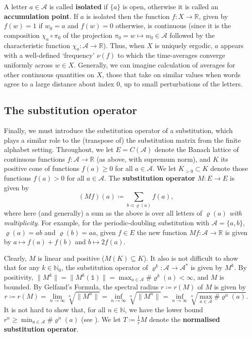 \documentclass[11pt]{amsart}
\numberwithin{equation}{section}
\theoremstyle{plain}
\theoremstyle{definition}
\newcommand{\R}{{\mathbb R}}
\newcommand{\N}{{\mathbb N}}
\newcommand{\mc}{\mathcal}
\newcommand{\A}{\mc A}
\newcommand{\sub}{\varrho}
\newcommand{\bbo}{\mathds{1}} %
\begin{document}
A letter \(a \in \A\) is called \textbf{isolated} if \(\{a\}\) is open, otherwise it is called an \textbf{accumulation point}. If \(a\) is isolated then the function \(f \colon X \to \R\), given by \(f(w) = 1\) if \(w_0 = a\) and \(f(w) = 0\) otherwise, is continuous (since it is the composition \(\chi_a \circ \pi_0\) of the projection \(\pi_0 = w \mapsto w_0 \in \A\) followed by the characteristic function \(\chi_a \colon \A \to \R\)). Thus, when \(X\) is uniquely ergodic, \(a\) appears with a well-defined `frequency' \(\nu(f)\) to which the time-averages converge uniformly across \(w \in X\). Generally, we can imagine calculation of averages for other continuous quantities on \(X\), those that take on similar values when words agree to a large distance about index \(0\), up to small perturbations of the letters.

\subsection{The substitution operator} \label{sec:sub operators}
Finally, we must introduce the substitution operator of a substitution, which plays a similar role to the (transpose of) the substitution matrix from the finite alphabet setting. Throughout, we let \(E = C(\A)\) denote the Banach lattice of continuous functions \(f \colon \A \to \R\) (as above, with supremum norm), and \(K\) its positive cone of functions \(f(a) \geq 0\) for all \(a \in \A\). We let \(K_{>0} \subset K\) denote those functions \(f(a) > 0\) for all \(a \in \A\). The \textbf{substitution operator} \(M \colon E \to E\) is given by
\[
(M f)(a) \coloneqq \sum_{b \triangleleft \sub(a)} f(a) ,
\]
where here (and generally) a sum as the above is over all letters of \(\sub(a)\) \emph{with multiplicity}. For example, for the periodic-doubling substitution with \(\A = \{a,b\}\), \(\sub(a) = ab\) and \(\sub(b) = aa\), given \(f \in E\) the new function \(Mf \colon \A \to \R\) is given by \(a \mapsto f(a) + f(b)\) and \(b \mapsto 2 f(a)\).

Clearly, \(M\) is linear and positive (\(M(K) \subseteq K\)). It also is not difficult to show \cite[Lemma 4.5]{MRW25} that for any \(k \in \N_0\), the substitution operator of \(\sub^k \colon \A \to \A^\ast\) is given by \(M^k\). By positivity, \(\|M^k\| = \|M^k(\bbo)\| = \max_{a \in \A} \# \sub^k(a) < \infty\), and \(M\) is bounded. By Gelfand's Formula, the spectral radius \(r \coloneqq r(M)\) of \(M\) is given by
\[
r \coloneqq r(M) = \lim_{n \to \infty} \sqrt[n]{\| M^n \|} = \inf_{n \to \infty} \sqrt[n]{\| M^n \|} = \inf_{n \to \infty} \sqrt[n]{ \max_{a \in \A} \# \sub^n(a) } .
\]
It is not hard to show that, for all \(n \in \N\), we have the lower bound \( r^n \geq \min_{a \in \A} \# \sub^n(a)\) (see \cite[Lemma 4.23]{MRW25}). We let \(T \coloneqq \frac{1}{r} M\) denote the \textbf{normalised substitution operator}.
\end{document}
